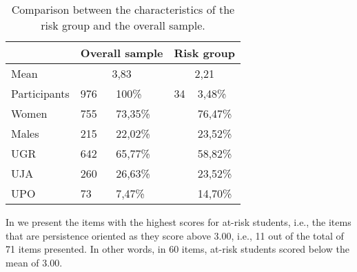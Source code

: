 \documentclass[english]{textolivre}
\begin{document}
\begin{table}[htbp]
\centering
\begin{threeparttable}
\caption{Comparison between the characteristics of the risk group and the overall sample.}
\label{tab04}
\begin{tabular}{l l l l l}
\toprule
& \multicolumn{2}{c}{Overall sample} & \multicolumn{2}{c}{Risk group} \\
\midrule
Mean & \multicolumn{2}{c}{3,83} & \multicolumn{2}{c}{2,21}  \\
Participants & 976 & 100\% & 34 & 3,48\%  \\
Women & 755 & 73,35\% & & 76,47\% \\
Males & 215 & 22,02\% & & 23,52\% \\
UGR & 642 & 65,77\% & & 58,82\% \\
UJA & 260 & 26,63\% & & 23,52\% \\
UPO & 73 & 7,47\% & & 14,70\% \\
\bottomrule
\end{tabular}
\end{threeparttable}
\end{table}

In  we present the items with the highest scores for at-risk students, i.e., the items that are persistence oriented as they score above 3.00, i.e., 11 out of the total of 71 items presented. In other words, in 60 items, at-risk students scored below the mean of 3.00.
\end{document}
